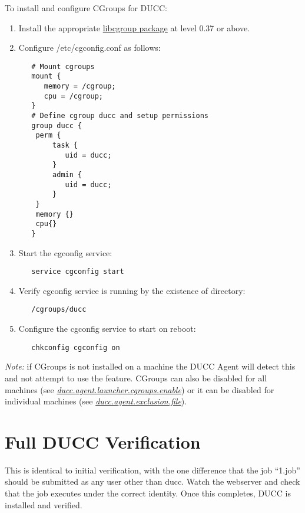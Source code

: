     To install and configure CGroups for DUCC:
    \begin{enumerate}
       \item Install the appropriate \hyperref[sec:install.prerequisites]{libcgroup package} at level 0.37
         or above.

       \item Configure /etc/cgconfig.conf as follows:
\begin{verbatim}
   # Mount cgroups
   mount {
      memory = /cgroup;
      cpu = /cgroup;
   }
   # Define cgroup ducc and setup permissions
   group ducc {
    perm {
        task {
           uid = ducc;
        }
        admin {
           uid = ducc;
        }
    }
    memory {}
    cpu{}
   }
\end{verbatim}
       \item Start the cgconfig service:
\begin{verbatim}
   service cgconfig start
\end{verbatim}
         
       \item Verify cgconfig service is running by the existence of directory: 
\begin{verbatim}
   /cgroups/ducc
\end{verbatim}

       \item Configure the cgconfig service to start on reboot:
\begin{verbatim}
   chkconfig cgconfig on
\end{verbatim}
    \end{enumerate}

{\em Note:} if CGroups is not installed on a machine the DUCC Agent will detect this and not 
  	attempt to use the feature. CGroups can also be disabled for all machines
   	(see \hyperref[itm:props-agent.cgroups.enable] {\em ducc.agent.launcher.cgroups.enable}) 
   	or it can be disabled for individual machines (see \hyperref[itm:props-agent.cgroups.exclusion]{\em ducc.agent.exclusion.file}).


 
\section{Full DUCC Verification}

This is identical to initial verification, with the one difference that the job ``1.job'' should be
submitted as any user other than ducc.  Watch the webserver and check that the job executes
under the correct identity.  Once this completes, DUCC is installed and verified.
 
